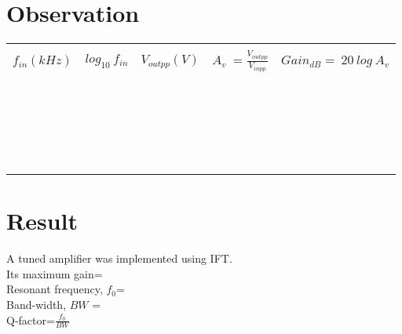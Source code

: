\section*{Observation}
\begin{center}

\begin{tabular}{|l|l|l|l|l|}

\hline
  & & & &\\
 
$f_{in} (kHz) $  & $log_{10}\ f_{in}$  &  $V_{outpp}(V)$ & $A_v\ =\frac{V_{outpp}}{V_{inpp}} $ & $Gain_{dB}=\ 20\ log\ A_v$ \\ \hline
 & & & &\\ \hline
& & & &\\ \hline
& & & &\\ \hline
& & & &\\ \hline
& & & &\\ \hline
& & & &\\ \hline
& & & &\\ \hline
& & & &\\ \hline
& & & &\\ \hline
& & & &\\ \hline
& & & &\\ \hline
& & & &\\ \hline
& & & &\\ \hline
& & & &\\ \hline
& & & &\\ \hline
& & & &\\ \hline
& & & &\\ \hline
& & & &\\ \hline
& & & &\\ \hline
& & & &\\ \hline
& & & &\\ \hline
\end{tabular}
\end{center}
\section*{Result}
A tuned amplifier was implemented using IFT.\\
Its maximum gain= \\
Resonant frequency, $f_0$= \\
Band-width, $BW$ =\\
Q-factor=$\frac{f_0}{BW}$
